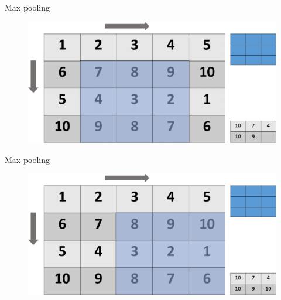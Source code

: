 \begin{frame}{Max pooling}
	\begin{figure}
		\includegraphics[width=.7\textwidth, center]{figures/maxpool6}
	\end{figure}
\end{frame}
\begin{frame}{Max pooling}
	\begin{figure}
		\includegraphics[width=.7\textwidth, center]{figures/maxpool7}
	\end{figure}
\end{frame}


